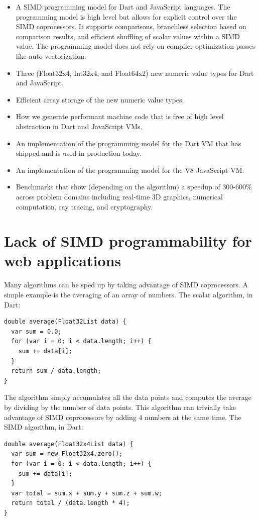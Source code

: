 \documentclass[preprint]{sigplanconf}
\begin{document}
\begin{itemize} 
\item A SIMD programming model for Dart and JavaScript languages. The programming model is high level but allows for explicit control over the SIMD coprocessors. It supports comparisons, branchless selection based on comparison results, and efficient shuffling of scalar values within a SIMD value. The programming model does not rely on compiler optimization passes like auto vectorization. 
\item Three (Float32x4, Int32x4, and Float64x2) new numeric value types for Dart and JavaScript.
\item Efficient array storage of the new numeric value types.
\item How we generate performant machine code that is free of high level abstraction in Dart and JavaScript VMs.
\item An implementation of the programming model for the Dart VM that has shipped and is used in production today.
\item An implementation of the programming model for the V8 JavaScript VM.
\item Benchmarks that show (depending on the algorithm) a speedup of 300-600\% across problem domains including real-time 3D graphics, numerical computation, ray tracing, and cryptography.
\end{itemize}

\section{Lack of SIMD programmability for web applications}
Many algorithms can be sped up by taking advantage of SIMD coprocessors. A simple example is the averaging of an array of numbers. The scalar algorithm, in Dart:

\begin{verbatim} 
double average(Float32List data) {
  var sum = 0.0;
  for (var i = 0; i < data.length; i++) {
    sum += data[i]; 
  }
  return sum / data.length;
}
\end{verbatim}

The algorithm simply accumulates all the data points and computes the average by dividing by the number of data points. This algorithm can trivially take advantage of SIMD coprocessors by adding 4 numbers at the same time. The SIMD algorithm, in Dart:

\begin{verbatim}
double average(Float32x4List data) {
  var sum = new Float32x4.zero();
  for (var i = 0; i < data.length; i++) {
    sum += data[i];
  }
  var total = sum.x + sum.y + sum.z + sum.w;
  return total / (data.length * 4);
}
\end{verbatim}
\end{document}
